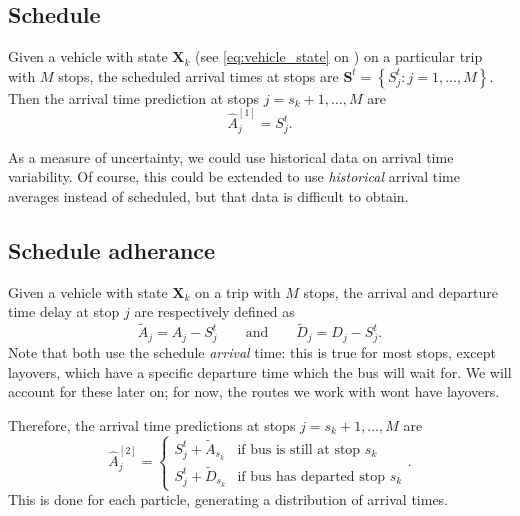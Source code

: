 \documentclass[14paper,twoside]{article}
\newcommand{\bX}{\mathbf{X}}
\newcommand{\bS}{\mathbf{S}}
\begin{document}
\subsection{Schedule}
\label{sec:pred-schedule}

Given a vehicle with state $\bX_k$ (see \cref{eq:vehicle_state} on ) 
on a particular trip with $M$ stops,
the scheduled arrival times at stops are $\bS^t = \left\{S_j^t : j = 1, \ldots, M\right\}$.
Then the arrival time prediction at stops $j = s_k + 1, \ldots, M$ are
\begin{equation}
  \label{eq:pred-schedule}
  \hat A_j^{[1]} = S_j^t.
\end{equation}

As a measure of uncertainty, we could use historical data on arrival time variability.
Of course, this could be extended to use \emph{historical} arrival time averages
instead of scheduled, but that data is difficult to obtain.


\subsection{Schedule adherance}
\label{sec:pred-schedule-adherance}

Given a vehicle with state $\bX_k$ on a trip with $M$ stops,
the arrival and departure time delay at stop $j$ are respectively defined as 
\begin{equation}
  \label{eq:arrival-departure-delay}
  \tilde A_j = A_j - S_j^t \qquad \text{and} \qquad \tilde D_j = D_j - S_j^t.
\end{equation}
Note that both use the schedule \emph{arrival} time: this is true for most stops,
except layovers, which have a specific departure time which the bus will wait for.
We will account for these later on;
for now, the routes we work with wont have layovers.


Therefore, the arrival time predictions at stops $j = s_k + 1, \ldots, M$ are
\begin{equation}
  \label{eq:pred-schedule-adherance}
  \hat A_j^{[2]} = 
  \begin{cases}
    S_j^t + \tilde A_{s_k} & \text{if bus is still at stop $s_k$} \\
    S_j^t + \tilde D_{s_k} & \text{if bus has departed stop $s_k$}
  \end{cases}.
\end{equation}
This is done for each particle, generating a distribution of arrival times.
\end{document}

